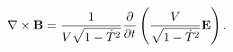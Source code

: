 \begin{equation}\label{ameq}
\nabla\times {\bf B}=\frac{1}{V\sqrt{1-\dot{T}^{2}}}
\frac{\partial}{\partial t}\left(\frac{V}{\sqrt{1-\dot{T}^{2}}}{\bf E}\right).
\end{equation}

